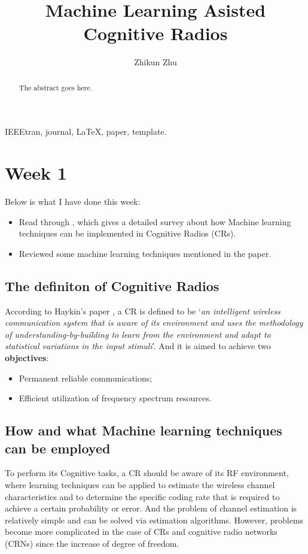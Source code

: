 \documentclass[journal]{IEEEtran}
\author{Zhikun Zhu%
}
\title{Machine Learning Asisted Cognitive Radios}
\begin{document}
\maketitle
\begin{abstract}
The abstract goes here.
\end{abstract}
\begin{IEEEkeywords}
IEEEtran, journal, \LaTeX, paper, template.
\end{IEEEkeywords}
\section{Week 1}
Below is what I have done this week:
\begin{itemize}
  \item Read through \cite{bkassiny2013survey}, which gives a detailed survey about how Machine learning techniques can be implemented in Cognitive Radios (CRs).
  \item Reviewed some machine learning techniques mentioned in the paper.
\end{itemize}
\subsection{The definiton of Cognitive Radios}
According to Haykin's paper \cite{haykin2005cognitive}, a CR is defined to be `\textsl{an intelligent wireless communication system that is aware of its environment and uses the methodology of understanding-by-building to learn from the environment and adapt to statistical variations in the input stimuli}'. And it is aimed to achieve two \textbf{objectives}:
\begin{itemize}
  \item Permanent reliable communications;
  \item Efficient utilization of frequency spectrum resources.
\end{itemize}
\subsection{How and what Machine learning techniques can be employed}
To perform its Cognitive tasks, a CR should be aware of its RF environment, where learning techniques can be applied to estimate the wireless channel characteristics and to determine the specific coding rate that is required to achieve a certain probability or error. And the problem of channel estimation is relatively simple and can be solved via estimation algorithms. However, problems become more complicated in the case of CRs and cognitive radio networks (CRNs) since the increase of degree of freedom.
\end{document}
